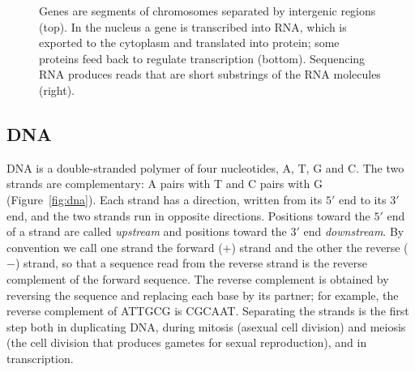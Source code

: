 \begin{figure}[t]
  \caption{Genes are segments of chromosomes separated by intergenic regions (top). In the nucleus a gene is transcribed into RNA, which is exported to the cytoplasm and translated into protein; some proteins feed back to regulate transcription (bottom). Sequencing RNA produces reads that are short substrings of the RNA molecules (right).}
  \label{fig:cell}
\end{figure}

\subsection{DNA}

DNA is a double-stranded polymer of four nucleotides, A, T, G and C. The two strands are complementary: A pairs with T and C pairs with G (Figure~\ref{fig:dna}). Each strand has a direction, written from its $5'$ end to its $3'$ end, and the two strands run in opposite directions. Positions toward the $5'$ end of a strand are called \emph{upstream} and positions toward the $3'$ end \emph{downstream}. By convention we call one strand the forward ($+$) strand and the other the reverse ($-$) strand, so that a sequence read from the reverse strand is the reverse complement of the forward sequence. The reverse complement is obtained by reversing the sequence and replacing each base by its partner; for example, the reverse complement of ATTGCG is CGCAAT. Separating the strands is the first step both in duplicating DNA, during mitosis (asexual cell division) and meiosis (the cell division that produces gametes for sexual reproduction), and in transcription.

